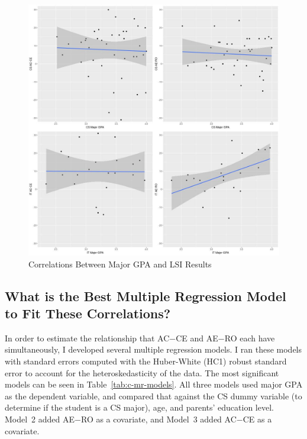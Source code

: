 \begin{figure}
  \centering
  \includegraphics[width=1.1\textwidth]{figures/chapter4/major_gpa_lm_plots.jpg}
  \caption{Correlations Between Major GPA and LSI Results}
  \label{fig:c-major_gpa_lm_plots}
\end{figure}

\subsection{What is the Best Multiple Regression Model to Fit These Correlations?}
In order to estimate the relationship that AC$-$CE and AE$-$RO each have simultaneously, I developed several multiple regression models. I ran these models with standard errors computed with the Huber-White (HC1) robust standard error to account for the heteroskedasticity of the data. The most significant models can be seen in Table~\ref{tab:c-mr-models}. All three models used major GPA as the dependent variable, and compared that against the CS dummy variable (to determine if the student is a CS major), age, and parents' education level. Model~2 added AE$-$RO as a covariate, and Model~3 added AC$-$CE as a covariate.


